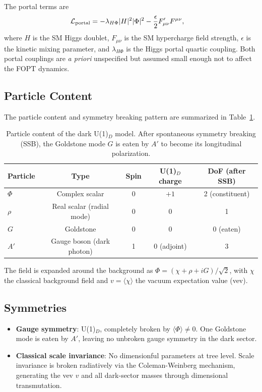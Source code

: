 \documentclass[a4paper,11pt]{article}
\begin{document}
The portal terms are
\begin{align}
\mathcal{L}_{\rm portal} &= -\lambda_{H\Phi} |H|^2 |\Phi|^2 - \frac{\epsilon}{2} F'_{\mu\nu} F^{\mu\nu},
\end{align}
where $H$ is the SM Higgs doublet, $F_{\mu\nu}$ is the SM hypercharge field strength, $\epsilon$ is the kinetic mixing parameter, and $\lambda_{H\Phi}$ is the Higgs portal quartic coupling. Both portal couplings are {\it a priori} unspecified but assumed small enough not to affect the FOPT dynamics.

\subsection{Particle Content}

The particle content and symmetry breaking pattern are summarized in Table~\ref{tab:particles}.

\begin{table}[htbp]
\centering
\caption{Particle content of the dark U(1)$_D$ model. After spontaneous symmetry breaking (SSB), the Goldstone mode $G$ is eaten by $A'$ to become its longitudinal polarization.}
\label{tab:particles}
\begin{tabular}{lcccc}
\toprule
Particle & Type & Spin & U(1)$_D$ charge & DoF (after SSB) \\
\midrule
$\Phi$ & Complex scalar & 0 & $+1$ & 2 (constituent) \\
$\rho$ & Real scalar (radial mode) & 0 & 0 & 1 \\
$G$ & Goldstone & 0 & 0 & 0 (eaten) \\
$A'$ & Gauge boson (dark photon) & 1 & 0 (adjoint) & 3 \\
\bottomrule
\end{tabular}
\end{table}

The field is expanded around the background as $\Phi = (\chi + \rho + iG)/\sqrt{2}$, with $\chi$ the classical background field and $v = \langle\chi\rangle$ the vacuum expectation value (vev).

\subsection{Symmetries}

\begin{itemize}
\item \textbf{Gauge symmetry}: U(1)$_D$, completely broken by $\langle\Phi\rangle \neq 0$. One Goldstone mode is eaten by $A'$, leaving no unbroken gauge symmetry in the dark sector.
\item \textbf{Classical scale invariance}: No dimensionful parameters at tree level. Scale invariance is broken radiatively via the Coleman-Weinberg mechanism, generating the vev $v$ and all dark-sector masses through dimensional transmutation.
\end{itemize}
\end{document}

